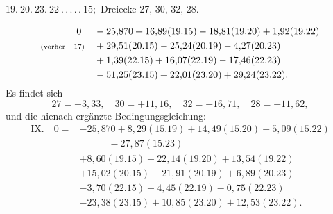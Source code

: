 \par\bigskip
\begin{center}
$19.\ 20.\ 23.\ 22\ .\,.\,.\,.\,.\ 15;$ Dreiecke 27, 30, 32, 28.
\end{center}
\[
\begin{aligned}
0={}&-25{,}870+16{,}89(19.15)-18{,}81(19.20)+1{,}92(19.22)\\
\text{\scriptsize(vorher $-17$)}\quad&+29{,}51(20.15)-25{,}24(20.19)-4{,}27(20.23)\\
&+1{,}39(22.15)+16{,}07(22.19)-17{,}46(22.23)\\
&-51{,}25(23.15)+22{,}01(23.20)+29{,}24(23.22).
\end{aligned}
\]
Es findet sich
\[
27=+3{,}33,\quad30=+11{,}16,\quad32=-16{,}71,\quad28=-11{,}62,
\]
und die hienach ergänzte Bedingungsgleichung:
\[
\begin{aligned}
\mathrm{IX.}\quad0={}&-25{,}870+8{,}29(15.19)+14{,}49(15.20)+5{,}09(15.22)\\
&\qquad\quad-27{,}87(15.23)\\
&+8{,}60(19.15)-22{,}14(19.20)+13{,}54(19.22)\\
&+15{,}02(20.15)-21{,}91(20.19)+6{,}89(20.23)\\
&-3{,}70(22.15)+4{,}45(22.19)-0{,}75(22.23)\\
&-23{,}38(23.15)+10{,}85(23.20)+12{,}53(23.22).
\end{aligned}
\]
